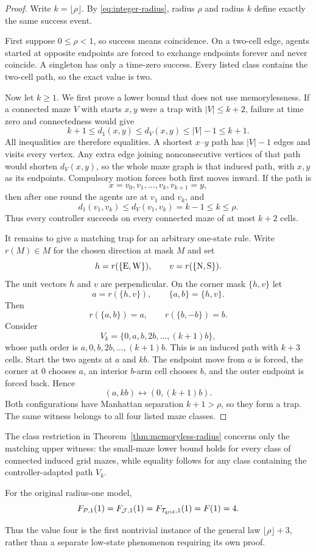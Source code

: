 \begin{proof}
Write $k=\lfloor\rho\rfloor$.  By \eqref{eq:integer-radius}, radius $\rho$ and radius $k$ define exactly the same success event.

First suppose $0\le\rho<1$, so success means coincidence.  On a two-cell edge, agents started at opposite endpoints are forced to exchange endpoints forever and never coincide.  A singleton has only a time-zero success.  Every listed class contains the two-cell path, so the exact value is two.

Now let $k\ge1$.  We first prove a lower bound that does not use memorylessness.  If a connected maze $V$ with starts $x,y$ were a trap with $|V|\le k+2$, failure at time zero and connectedness would give
\[
 k+1\le d_1(x,y)\le d_V(x,y)\le |V|-1\le k+1.
\]
All inequalities are therefore equalities.  A shortest $x$--$y$ path has $|V|-1$ edges and visits every vertex.  Any extra edge joining nonconsecutive vertices of that path would shorten $d_V(x,y)$, so the whole maze graph is that induced path, with $x,y$ as its endpoints.  Compulsory motion forces both first moves inward.  If the path is
\[
 x=v_0,v_1,\ldots,v_k,v_{k+1}=y,
\]
then after one round the agents are at $v_1$ and $v_k$, and
\[
 d_1(v_1,v_k)\le d_V(v_1,v_k)=k-1\le k\le\rho.
\]
Thus every controller succeeds on every connected maze of at most $k+2$ cells.

It remains to give a matching trap for an arbitrary one-state rule.  Write $r(M)\in M$ for the chosen direction at mask $M$ and set
\[
 h=r(\{\mathrm{E},\mathrm{W}\}),\qquad v=r(\{\mathrm{N},\mathrm{S}\}).
\]
The unit vectors $h$ and $v$ are perpendicular.  On the corner mask $\{h,v\}$ let
\[
 a=r(\{h,v\}),\qquad \{a,b\}=\{h,v\}.
\]
Then
\[
 r(\{a,b\})=a,\qquad r(\{b,-b\})=b.
\]
Consider
\[
 V_k=\{0,a,b,2b,\ldots,(k+1)b\},
\]
whose path order is $a,0,b,2b,\ldots,(k+1)b$.  This is an induced path with $k+3$ cells.  Start the two agents at $a$ and $kb$.  The endpoint move from $a$ is forced, the corner at $0$ chooses $a$, an interior $b$-arm cell chooses $b$, and the outer endpoint is forced back.  Hence
\[
 (a,kb)\longleftrightarrow(0,(k+1)b).
\]
Both configurations have Manhattan separation $k+1>\rho$, so they form a trap.  The same witness belongs to all four listed maze classes.
\end{proof}



The class restriction in Theorem~\ref{thm:memoryless-radius} concerns only the matching upper witness: the small-maze lower bound holds for every class of connected induced grid mazes, while equality follows for any class containing the controller-adapted path $V_k$.

\begin{corollary}\label{cor:one-state-radius-one}\label{thm:A}
For the original radius-one model,
\[
 F_{\mathcal P,1}(1)=F_{\mathcal J,1}(1)
 =F_{\mathcal T_{\rm grid},1}(1)=F(1)=4.
\]
\end{corollary}

Thus the value four is the first nontrivial instance of the general law $\lfloor\rho\rfloor+3$, rather than a separate low-state phenomenon requiring its own proof.
